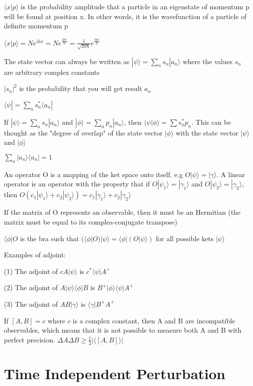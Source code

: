 \documentclass[12pt]{article}
\begin{document}
\begin{spacing}{2.0}
$\langle x|p \rangle$ is the probability amplitude that a particle in an eigenstate of momentum p will be found at position x. In other words, it is the wavefunction of a particle of definite momentum p

$\langle x|p \rangle = Ne^{ikx}=Ne^{\frac{ipx}{\hbar}}= \frac{1}{\sqrt{2\pi\hbar}} e^{\frac{ipx}{\hbar}}$

The state vector can always be written as $|\psi\rangle = \sum_n s_n| a_n\rangle$ where the values $s_n$ are arbitrary complex constants

$|s_n|^2$ is the probability that you will get result $a_n$

$\langle \psi| = \sum_n s_n^* \langle a_n|$

If $|\psi\rangle=\sum_n s_n|a_n\rangle$ and $|\phi\rangle= \sum_n p_n|a_n\rangle$, then $\langle \psi|\phi \rangle= \sum s_n^* p_n$. This can be thought as the "degree of overlap" of the state vector $|\phi \rangle$ with the state vector $|\psi \rangle$ and $|\phi \rangle$

$\sum_n |a_n\rangle \langle a_n|=1$

An operator O is a mapping of the ket space onto itself. e.g $O|\psi \rangle= |\gamma \rangle$. A linear operator is an operator with the property that if $O|\psi_1 \rangle= |\gamma_1 \rangle$ and $O|\psi_2 \rangle= |\gamma_2 \rangle$, then $O(c_1|\psi_1 \rangle +c_2 |\psi_2 \rangle)  = c_1|\gamma_1 \rangle + c_2|\gamma_2 \rangle$

If the matrix of O represents an observable, then it must be an Hermitian (the matrix must be equal to its complea-conjugate transpose)

$\langle \phi|O$ is the bra such that $(\langle \phi|O)|\psi \rangle= \langle \phi|(O|\psi \rangle)$ for all possible kets $|\psi \rangle$

Examples of adjoint:

(1) The adjoint of $cA|\psi \rangle$ is $c^* \langle \psi| A^+$

(2) The adjoint of $A|\psi\rangle \langle\phi|B$ is $B^+|\phi\rangle \langle\psi|A^+$

(3) The adjoint of $AB|\gamma\rangle$ is $\langle\gamma|B^+A^+$

If $[A,B]=c$ where $c$ is a complex constant, then A and B are incompatible observables, which means that it is not possible to measure both A and B with perfect precision. $\Delta A \Delta B \ge \frac{1}{2} \left| \langle [A,B] \rangle \right|$

\section{Time Independent Perturbation}


\end{spacing}
\end{document}
